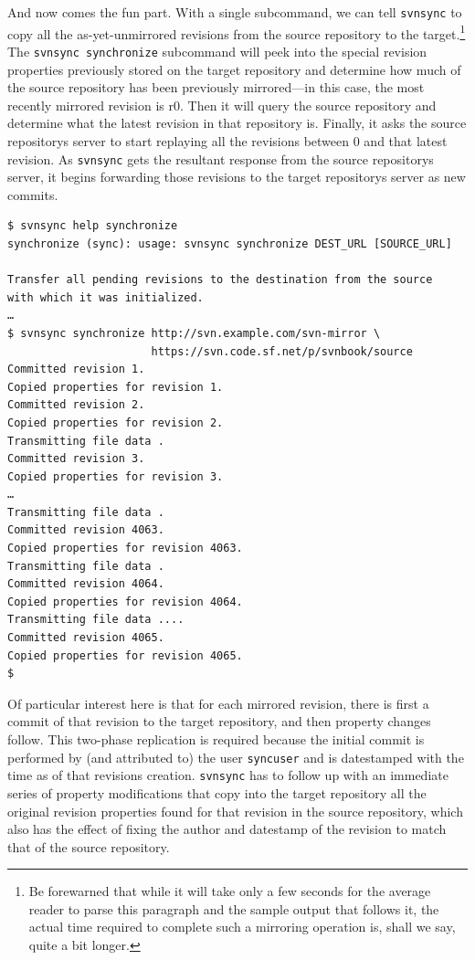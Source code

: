 And now comes the fun part. With a single subcommand, we can tell
\texttt{svnsync} to copy all the as-yet-unmirrored revisions from the
source repository to the target.\footnote{Be forewarned that while it
  will take only a few seconds for the average reader to parse this
  paragraph and the sample output that follows it, the actual time
  required to complete such a mirroring operation is, shall we say,
  quite a bit longer.} The \texttt{svnsync\ synchronize} subcommand will
peek into the special revision properties previously stored on the
target repository and determine how much of the source repository has
been previously mirrored---in this case, the most recently mirrored
revision is r0. Then it will query the source repository and determine
what the latest revision in that repository is. Finally, it asks the
source repository\textquotesingle s server to start replaying all the
revisions between 0 and that latest revision. As \texttt{svnsync} gets
the resultant response from the source repository\textquotesingle s
server, it begins forwarding those revisions to the target
repository\textquotesingle s server as new commits.

\begin{verbatim}
$ svnsync help synchronize
synchronize (sync): usage: svnsync synchronize DEST_URL [SOURCE_URL]

Transfer all pending revisions to the destination from the source
with which it was initialized.
…
$ svnsync synchronize http://svn.example.com/svn-mirror \
                      https://svn.code.sf.net/p/svnbook/source
Committed revision 1.
Copied properties for revision 1.
Committed revision 2.
Copied properties for revision 2.
Transmitting file data .
Committed revision 3.
Copied properties for revision 3.
…
Transmitting file data .
Committed revision 4063.
Copied properties for revision 4063.
Transmitting file data .
Committed revision 4064.
Copied properties for revision 4064.
Transmitting file data ....
Committed revision 4065.
Copied properties for revision 4065.
$
\end{verbatim}

Of particular interest here is that for each mirrored revision, there is
first a commit of that revision to the target repository, and then
property changes follow. This two-phase replication is required because
the initial commit is performed by (and attributed to) the user
\texttt{syncuser} and is datestamped with the time as of that
revision\textquotesingle s creation. \texttt{svnsync} has to follow up
with an immediate series of property modifications that copy into the
target repository all the original revision properties found for that
revision in the source repository, which also has the effect of fixing
the author and datestamp of the revision to match that of the source
repository.


